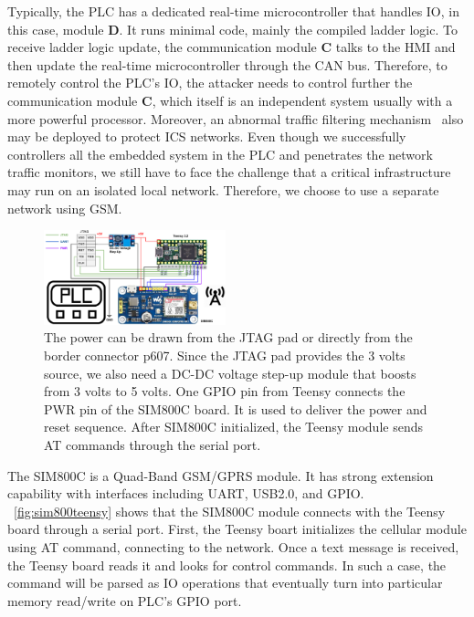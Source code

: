 Typically, the PLC has a dedicated real-time microcontroller
that handles IO, in this case, module \textbf{D}. It runs minimal code, mainly the compiled ladder logic.  To receive ladder logic update, the communication module \textbf{C} talks to the HMI and then update the real-time microcontroller through the CAN bus. Therefore, to remotely control the PLC's IO, the attacker needs to control further the communication module \textbf{C}, which itself is an independent system usually with a more powerful processor. Moreover, an abnormal traffic filtering mechanism~\cite{kim2016abnormal} also may be deployed to protect ICS networks. Even though we successfully controllers all the embedded system in the PLC and penetrates the network traffic monitors, we still have to face the challenge that a critical infrastructure may run on an isolated local network. Therefore, we choose to use a separate network using GSM.

\begin{figure}[th]
	\includegraphics[width=0.47\textwidth]{figures/sim800teensy}
	\centering
	\caption{The power can be drawn from the JTAG pad or directly from the border connector p607. Since the JTAG pad provides the 3 volts source, we also need a DC-DC voltage step-up module that boosts from 3 volts to 5 volts. One GPIO pin from Teensy connects the PWR pin of the SIM800C board. It is used to deliver the power and reset sequence. After SIM800C initialized, the Teensy module sends AT commands through the serial port.}
	\label{fig:sim800teensy}
\end{figure}

The SIM800C is a Quad-Band GSM/GPRS module. It has strong extension capability with interfaces including UART, USB2.0, and GPIO. ~\autoref{fig:sim800teensy} shows that the SIM800C module connects with the Teensy board through a serial port. First, the Teensy boart initializes the cellular module using AT command, connecting to the network. Once a text message is received, the Teensy board reads it and looks for control commands. In such a case,  the command will be parsed as IO operations that eventually turn into particular memory read/write on PLC's GPIO port.
